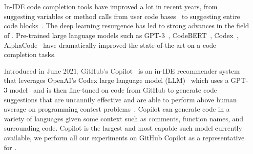 \section{\cct{}}
In-IDE code completion tools have improved a lot in recent years, from suggesting variables or method calls from user code bases~\cite{mandelin2005} to suggesting entire code blocks~\cite{Ciniselli2021}. The deep learning resurgence has led to strong advances in the field of \cct{}. Pre-trained large language models such as GPT-3~\cite{Gpt3}, CodeBERT~\cite{codebert}, Codex~\cite{copilot}, AlphaCode~\cite{alphacode} have dramatically improved the state-of-the-art on a code completion tasks.

Introduced in June 2021, GitHub's Copilot~\cite{Copilot-web} is an in-IDE recommender system that leverages OpenAI's Codex large language model (LLM)~\cite{copilot} which uses a GPT-3 model~\cite{Gpt3} and is then fine-tuned on code from GitHub to generate code suggestions that are uncannily effective and are able to perform above human average on programming contest problems~\cite{empirical_eval}. Copilot can generate code in a variety of languages given some context such as comments, function names, and surrounding code. Copilot is the largest and most capable such model currently available, we perform all our experiments on GitHub Copilot as a representative for \cct{}.